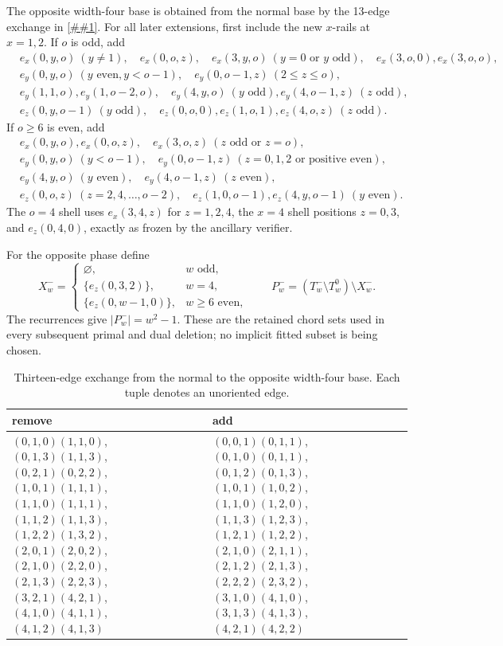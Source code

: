 \documentclass[11pt]{article}
\newcommand{\cref}[1]{\autoref{##1}}%
\begin{document}
The opposite width-four base is obtained from the normal base by the 13-edge
exchange in \cref{tab:exchange}.  For all later extensions, first include the
new \(x\)-rails at \(x=1,2\).  If \(o\) is odd, add
\begin{align*}
&e_x(0,y,o)\ (y\ne1),\quad e_x(0,o,z),\quad
 e_x(3,y,o)\ (y=0\text{ or }y\text{ odd}),\quad e_x(3,o,0),e_x(3,o,o),\\
&e_y(0,y,o)\ (y\text{ even},y<o-1),\quad e_y(0,o-1,z)\ (2\leq z\leq o),\\
&e_y(1,1,o),e_y(1,o-2,o),\quad e_y(4,y,o)\ (y\text{ odd}),
 e_y(4,o-1,z)\ (z\text{ odd}),\\
&e_z(0,y,o-1)\ (y\text{ odd}),\quad e_z(0,o,0),e_z(1,o,1),
 e_z(4,o,z)\ (z\text{ odd}).
\end{align*}
If \(o\geq6\) is even, add
\begin{align*}
&e_x(0,y,o),e_x(0,o,z),\quad e_x(3,o,z)\ (z\text{ odd or }z=o),\\
&e_y(0,y,o)\ (y<o-1),\quad
 e_y(0,o-1,z)\ (z=0,1,2\text{ or positive even}),\\
&e_y(4,y,o)\ (y\text{ even}),\quad e_y(4,o-1,z)\ (z\text{ even}),\\
&e_z(0,o,z)\ (z=2,4,\ldots,o-2),\quad e_z(1,0,o-1),
 e_z(4,y,o-1)\ (y\text{ even}).
\end{align*}
The \(o=4\) shell uses \(e_x(3,4,z)\) for \(z=1,2,4\), the \(x=4\)
shell positions \(z=0,3\), and \(e_z(0,4,0)\), exactly as frozen by the
ancillary verifier.

For the opposite phase define
\begin{equation}\label{eq:Xminus}
 X_w^-=\begin{cases}
 \varnothing,&w\text{ odd},\\
 \{e_z(0,3,2)\},&w=4,\\
 \{e_z(0,w-1,0)\},&w\geq6\text{ even},
 \end{cases}
 \qquad
 P_w^-=(T_w^-\setminus T_w^0)\setminus X_w^-.
\end{equation}
The recurrences give \(|P_w^-|=w^2-1\).  These are the retained chord sets
used in every subsequent primal and dual deletion; no implicit fitted subset
is being chosen.

\begin{table}[p]
\centering
\caption{Thirteen-edge exchange from the normal to the opposite width-four
base.  Each tuple denotes an unoriented edge.}
\label{tab:exchange}
\scriptsize
\begin{tabular}{@{}p{}p{}@{}}
\toprule
remove & add\\
\midrule
\((0,1,0)(1,1,0)\), \((0,1,3)(1,1,3)\),
\((0,2,1)(0,2,2)\), \((1,0,1)(1,1,1)\),
\((1,1,0)(1,1,1)\), \((1,1,2)(1,1,3)\),
\((1,2,2)(1,3,2)\), \((2,0,1)(2,0,2)\),
\((2,1,0)(2,2,0)\), \((2,1,3)(2,2,3)\),
\((3,2,1)(4,2,1)\), \((4,1,0)(4,1,1)\),
\((4,1,2)(4,1,3)\)
&
\((0,0,1)(0,1,1)\), \((0,1,0)(0,1,1)\),
\((0,1,2)(0,1,3)\), \((1,0,1)(1,0,2)\),
\((1,1,0)(1,2,0)\), \((1,1,3)(1,2,3)\),
\((1,2,1)(1,2,2)\), \((2,1,0)(2,1,1)\),
\((2,1,2)(2,1,3)\), \((2,2,2)(2,3,2)\),
\((3,1,0)(4,1,0)\), \((3,1,3)(4,1,3)\),
\((4,2,1)(4,2,2)\)\\
\bottomrule
\end{tabular}
\end{table}
\end{document}
